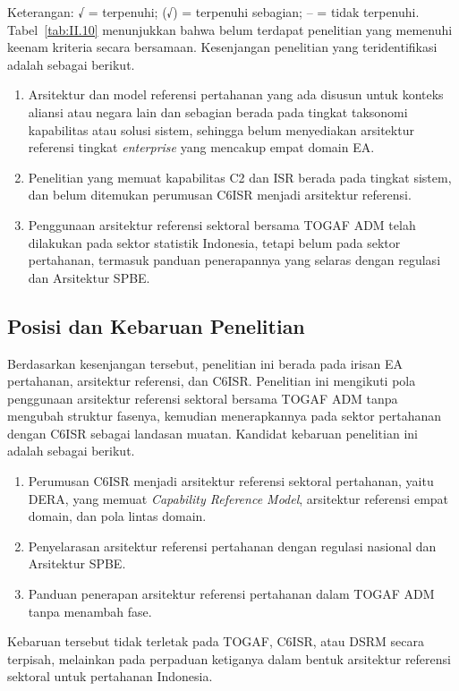 Keterangan: √ = terpenuhi; (√) = terpenuhi sebagian; – = tidak terpenuhi. Tabel~\ref{tab:II.10} menunjukkan bahwa belum terdapat penelitian yang memenuhi keenam kriteria secara bersamaan. Kesenjangan penelitian yang teridentifikasi adalah sebagai berikut.

\begin{enumerate}[label=\arabic*.]
\item Arsitektur dan model referensi pertahanan yang ada disusun untuk konteks aliansi atau negara lain dan sebagian berada pada tingkat taksonomi kapabilitas atau solusi sistem, sehingga belum menyediakan arsitektur referensi tingkat \textit{enterprise} yang mencakup empat domain EA.
\item Penelitian yang memuat kapabilitas C2 dan ISR berada pada tingkat sistem, dan belum ditemukan perumusan C6ISR menjadi arsitektur referensi.
\item Penggunaan arsitektur referensi sektoral bersama TOGAF ADM telah dilakukan pada sektor statistik Indonesia, tetapi belum pada sektor pertahanan, termasuk panduan penerapannya yang selaras dengan regulasi dan Arsitektur SPBE.
\end{enumerate}

\subsection{Posisi dan Kebaruan Penelitian}
\label{sec:II.8.5}

Berdasarkan kesenjangan tersebut, penelitian ini berada pada irisan EA pertahanan, arsitektur referensi, dan C6ISR. Penelitian ini mengikuti pola penggunaan arsitektur referensi sektoral bersama TOGAF ADM tanpa mengubah struktur fasenya, kemudian menerapkannya pada sektor pertahanan dengan C6ISR sebagai landasan muatan. Kandidat kebaruan penelitian ini adalah sebagai berikut.

\begin{enumerate}[label=\arabic*.]
\item Perumusan C6ISR menjadi arsitektur referensi sektoral pertahanan, yaitu DERA, yang memuat \textit{Capability Reference Model}, arsitektur referensi empat domain, dan pola lintas domain.
\item Penyelarasan arsitektur referensi pertahanan dengan regulasi nasional dan Arsitektur SPBE.
\item Panduan penerapan arsitektur referensi pertahanan dalam TOGAF ADM tanpa menambah fase.
\end{enumerate}

Kebaruan tersebut tidak terletak pada TOGAF, C6ISR, atau DSRM secara terpisah, melainkan pada perpaduan ketiganya dalam bentuk arsitektur referensi sektoral untuk pertahanan Indonesia.
